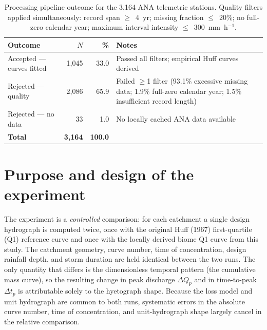 \documentclass[11pt]{article}
\begin{document}
\begin{table}[h]
  \centering
  \caption{Processing pipeline outcome for the 3{,}164 ANA telemetric
    stations. Quality filters applied simultaneously: record span
    $\geq$~4~yr; missing fraction $\leq$~20\%; no full-zero calendar
    year; maximum interval intensity $\leq$~300~mm~h$^{-1}$.}
  \label{tab:supp_processing}
  \small
  \begin{tabular}{lrrp{6.5cm}}
    \toprule
    Outcome & $N$ & \% & Notes \\
    \midrule
    Accepted — curves fitted & 1{,}045 & 33.0 &
      Passed all filters; empirical Huff curves derived \\
    Rejected — quality       & 2{,}086 & 65.9 &
      Failed $\geq$1 filter (93.1\% excessive missing data;
      1.9\% full-zero calendar year; 1.5\% insufficient
      record length) \\
    Rejected — no data       &    33   &  1.0 &
      No locally cached ANA data available \\
    \midrule
    \textbf{Total}           & \textbf{3{,}164} & \textbf{100.0} & \\
    \bottomrule
  \end{tabular}
\end{table}

\section{Purpose and design of the experiment}
\label{sec:supp_purpose}

The experiment is a \emph{controlled} comparison: for each catchment a
single design hydrograph is computed twice, once with the original
Huff (1967) first-quartile (Q1) reference curve and once with the
locally derived biome Q1 curve from this study. The catchment geometry,
curve number, time of concentration, design rainfall depth, and storm
duration are held identical between the two runs. The only quantity
that differs is the dimensionless temporal pattern (the cumulative mass
curve), so the resulting change in peak discharge $\Delta Q_p$ and in
time-to-peak $\Delta t_p$ is attributable solely to the hyetograph
shape. Because the loss model and unit hydrograph are common to both
runs, systematic errors in the absolute curve number, time of
concentration, and unit-hydrograph shape largely cancel in the relative
comparison.

\end{document}
